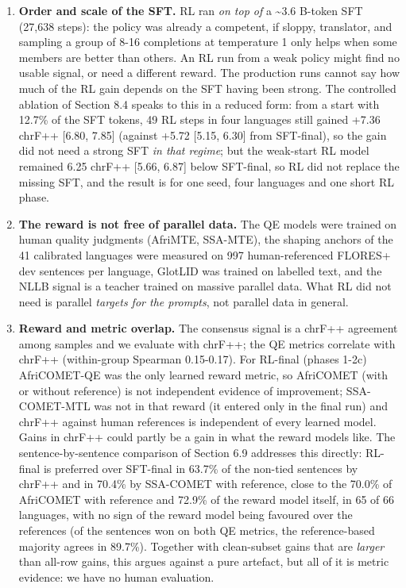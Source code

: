 \begin{enumerate}
\def\labelenumi{\arabic{enumi}.}
\tightlist
\item
  \textbf{Order and scale of the SFT.} RL ran \emph{on top of} a \textasciitilde3.6 B-token SFT (27,638 steps): the policy was already a competent, if sloppy, translator, and sampling a group of 8-16 completions at temperature 1 only helps when some members are better than others. An RL run from a weak policy might find no usable signal, or need a different reward. The production runs cannot say how much of the RL gain depends on the SFT having been strong. The controlled ablation of Section 8.4 speaks to this in a reduced form: from a start with 12.7\% of the SFT tokens, 49 RL steps in four languages still gained +7.36 chrF++ {[}6.80, 7.85{]} (against +5.72 {[}5.15, 6.30{]} from SFT-final), so the gain did not need a strong SFT \emph{in that regime}; but the weak-start RL model remained 6.25 chrF++ {[}5.66, 6.87{]} below SFT-final, so RL did not replace the missing SFT, and the result is for one seed, four languages and one short RL phase.
\item
  \textbf{The reward is not free of parallel data.} The QE models were trained on human quality judgments (AfriMTE, SSA-MTE), the shaping anchors of the 41 calibrated languages were measured on 997 human-referenced FLORES+ dev sentences per language, GlotLID was trained on labelled text, and the NLLB signal is a teacher trained on massive parallel data. What RL did not need is parallel \emph{targets for the prompts}, not parallel data in general.
\item
  \textbf{Reward and metric overlap.} The consensus signal is a chrF++ agreement among samples and we evaluate with chrF++; the QE metrics correlate with chrF++ (within-group Spearman 0.15-0.17). For RL-final (phases 1-2c) AfriCOMET-QE was the only learned reward metric, so AfriCOMET (with or without reference) is not independent evidence of improvement; SSA-COMET-MTL was not in that reward (it entered only in the final run) and chrF++ against human references is independent of every learned model. Gains in chrF++ could partly be a gain in what the reward models like. The sentence-by-sentence comparison of Section 6.9 addresses this directly: RL-final is preferred over SFT-final in 63.7\% of the non-tied sentences by chrF++ and in 70.4\% by SSA-COMET with reference, close to the 70.0\% of AfriCOMET with reference and 72.9\% of the reward model itself, in 65 of 66 languages, with no sign of the reward model being favoured over the references (of the sentences won on both QE metrics, the reference-based majority agrees in 89.7\%). Together with clean-subset gains that are \emph{larger} than all-row gains, this argues against a pure artefact, but all of it is metric evidence: we have no human evaluation.

\end{enumerate}
